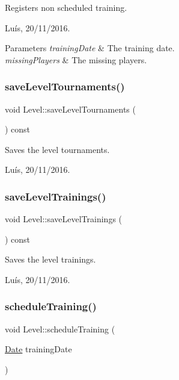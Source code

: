 Registers non scheduled training. 

Luís, 20/11/2016. 


\begin{DoxyParams}{Parameters}
{\em training\+Date} & The training date. \\
\hline
{\em missing\+Players} & The missing players. \\
\hline
\end{DoxyParams}
\hypertarget{class_level_ac4dc4739fe40da18e9cf19b2a42c7b43}{}\label{class_level_ac4dc4739fe40da18e9cf19b2a42c7b43} 
\subsubsection{\texorpdfstring{save\+Level\+Tournaments()}{saveLevelTournaments()}}
{\footnotesize\ttfamily void Level\+::save\+Level\+Tournaments (\begin{DoxyParamCaption}{ }\end{DoxyParamCaption}) const}



Saves the level tournaments. 

Luís, 20/11/2016. \hypertarget{class_level_ab1d7ebab6cd1338ba044dc54fe6fd38b}{}\label{class_level_ab1d7ebab6cd1338ba044dc54fe6fd38b} 
\subsubsection{\texorpdfstring{save\+Level\+Trainings()}{saveLevelTrainings()}}
{\footnotesize\ttfamily void Level\+::save\+Level\+Trainings (\begin{DoxyParamCaption}{ }\end{DoxyParamCaption}) const}



Saves the level trainings. 

Luís, 20/11/2016. \hypertarget{class_level_aee00ac018e11b0c0fa8a42ee45ac2ae8}{}\label{class_level_aee00ac018e11b0c0fa8a42ee45ac2ae8} 
\subsubsection{\texorpdfstring{schedule\+Training()}{scheduleTraining()}}
{\footnotesize\ttfamily void Level\+::schedule\+Training (\begin{DoxyParamCaption}\item[{\hyperlink{class_date}{Date}}]{training\+Date }\end{DoxyParamCaption})}



